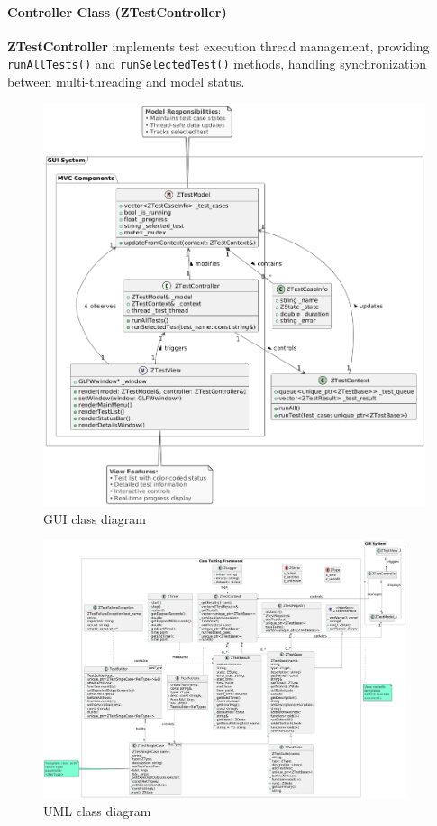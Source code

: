 \documentclass[english]{article}
\begin{document}
\paragraph{Controller Class (\textbf{ZTestController})}
\textbf{ZTestController} implements test execution thread management, providing \texttt{runAllTests()} and \texttt{runSelectedTest()} methods, handling synchronization between multi-threading and model status.
\begin{figure}[H]
    \centering
    \includegraphics[angle=270,width=\textwidth]{img/umlgui.png} %
    \caption{ GUI class diagram}
    \label{fig:diagram}
\end{figure}
\begin{figure}[H]
    \centering
    \includegraphics[angle=270,width=0.95\textwidth]{img/umlcore.png} %
    \caption{ UML class diagram}
    \label{fig:diagram}
\end{figure}
\end{document}
